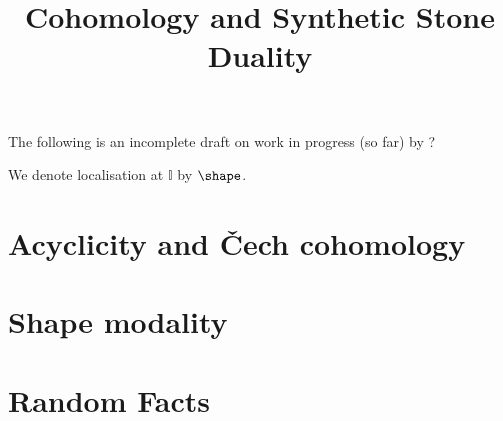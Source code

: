 \documentclass{../util/zariski}
\title{Cohomology and Synthetic Stone Duality}
\begin{document}
\maketitle

The following is an incomplete draft on work in progress (so far)
by ?

We denote localisation at $\mathbb{I}$ by $\shape$.

\tableofcontents

\section{Acyclicity and \v{C}ech cohomology}


\section{Shape modality}


\section{Random Facts}


\printindex

\printbibliography
\end{document}
